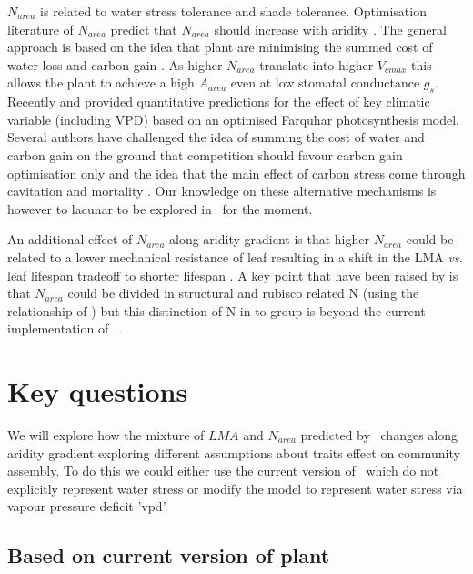 \documentclass[a4paper,11pt]{article}
\begin{document}
$N_{area}$ is related to water stress tolerance and shade tolerance. Optimisation literature of $N_{area}$ predict that $N_{area}$ should
increase with aridity \citep{Wright-2003}. The general approach is
based on the idea that plant are minimising the summed cost of water
loss and carbon gain
\citep{Medlyn-2002,Wright-2003,Prentice-2014,Lu-2016,Wang-2017,Dong-2017}. As
higher $N_{area}$ translate into higher $V_{cmax}$ this allows the
plant to achieve a high $A_{area}$ even at low stomatal conductance
$g_s$. Recently \citet{Prentice-2014} and \citet{Dong-2017} provided
quantitative predictions for the effect of key climatic variable
(including VPD) based on an optimised Farquhar photosynthesis
model. Several authors have challenged the idea of summing the cost of
water and carbon gain on the ground that competition should favour
carbon gain optimisation only \citep{Wolf-2016} and the idea that the
main effect of carbon stress come through cavitation and mortality \citep{Sperry-2016,Sperry-2017}. Our knowledge on these alternative mechanisms is however to lacunar to be explored in \plant\ for the moment.

An additional effect of $N_{area}$ along aridity gradient is that higher $N_{area}$ could be related to a lower mechanical resistance of leaf resulting in a shift in the LMA \textit{vs.} leaf lifespan tradeoff to shorter lifespan \citep{Wright-2002a}. A key point that have been raised by \citet{Dong-2017} is that
$N_{area}$ could be divided in structural and rubisco related N (using
the relationship of \citet{Onoda-2004}) but this distinction of N in to group is beyond the current implementation of \plant\ .



\section{Key questions}

We will explore how the mixture of $LMA$ and $N_{area}$ predicted by \plant\ changes along aridity gradient exploring different assumptions about traits effect on community assembly. To do this we could either use the current version of \plant\ which do not explicitly represent water stress or modify the model to represent water stress via vapour pressure deficit 'vpd'.

\subsection{Based on current version of plant}
\end{document}
